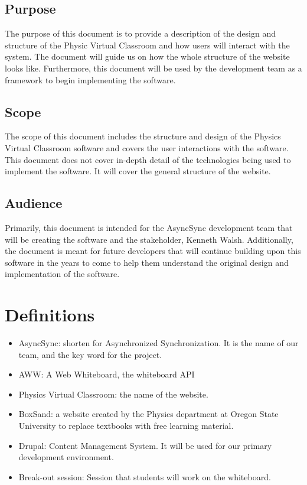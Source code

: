 \documentclass[10pt]{article}
\begin{document}
    \subsection{Purpose}
       The purpose of this document is to provide a description of the design and structure of the Physic Virtual Classroom and how users will interact with the system. The document will guide us on how the whole structure of the website looks like. Furthermore, this document will be used by the development team as a framework to begin implementing the software.

    \subsection{Scope}
        The scope of this document includes the structure and design of the Physics Virtual Classroom software and covers the user interactions with the software. This document does not cover in-depth detail of the technologies being used to implement the software. It will cover the general structure of the website.

    \subsection{Audience}
        Primarily, this document is intended for the AsyncSync development team that will be creating the software and the stakeholder, Kenneth Walsh. Additionally, the document is meant for future developers that will continue building upon this software in the years to come to help them understand the original design and implementation of the software.

\section{Definitions}
    \begin{itemize}
        \item AsyncSync: shorten for Asynchronized Synchronization. It is the name of our team, and the key word for the project.
        \item AWW: A Web Whiteboard, the whiteboard API
        \item Physics Virtual Classroom: the name of the website.
        \item BoxSand: a website created by the Physics department at Oregon State University to replace textbooks with free learning material.
        \item Drupal: Content Management System. It will be used for our primary development environment.
        \item Break-out session: Session that students will work on the whiteboard.
    \end{itemize}
\end{document}
